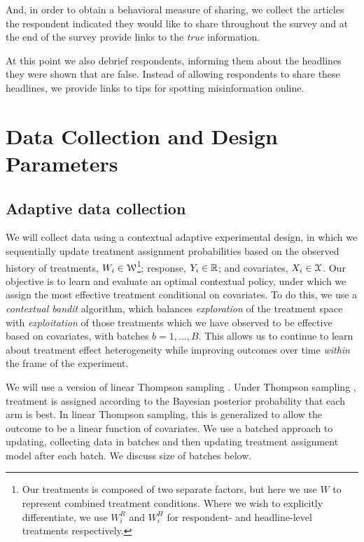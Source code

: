 \documentclass[letterpaper, 12pt, parskip=full,]{scrartcl}
\begin{document}
And, in order to obtain a behavioral measure of sharing, we collect the articles the respondent indicated they would like to share throughout the survey and at the end of the survey provide links to the \textit{true} information. 

At this point we also debrief respondents, informing them about the headlines they were shown that are false. Instead of allowing respondents to share these headlines, we provide links to tips for spotting misinformation online. 




\section{Data Collection and Design Parameters}

\subsection{Adaptive data collection}
We will collect data using a contextual adaptive experimental design, in which we sequentially update treatment assignment probabilities based on the observed history of treatments, $W_i \in {\EuScript W}$\footnote{Our treatments is composed of two separate factors, but here we use $W$ to represent combined treatment conditions. Where we wish to explicitly differentiate, we use $W^R_i$ and $W^H_i$ for respondent- and headline-level treatments respectively.}; response,  $Y_i \in {\mathbb R}$; and covariates, $X_i \in {\EuScript X}$. Our objective is to learn and evaluate an optimal contextual policy, under which we assign the most effective treatment conditional on covariates. To do this, we use a \textit{contextual bandit} algorithm, which balances \textit{exploration} of the treatment space with \textit{exploitation} of those treatments which we have observed to be effective based on covariates, with batches $b = 1, \dots, B$.  This allows us to continue to learn about treatment effect heterogeneity while improving outcomes over time \textit{within} the frame of the experiment. 

We will use a version of linear Thompson sampling \citep{agrawal2013thompson}. Under Thompson sampling \citep{thompson1933likelihood,thompson1935theory}, treatment is assigned according to the Bayesian posterior probability that each arm is best. In linear Thompson sampling, this is generalized to allow the outcome to be a linear function of covariates. We use a batched approach to updating, collecting data in batches and then updating treatment assignment model after each batch. We discuss size of batches below. 
\end{document}
